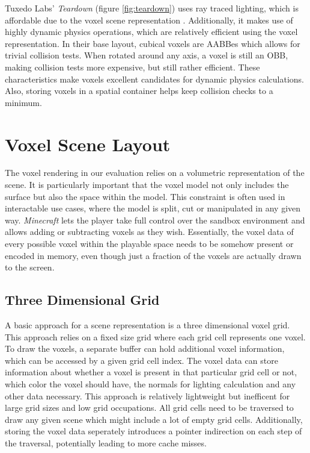 \noindent
Tuxedo Labs' \emph{Teardown} (figure \ref{fig:teardown}) uses ray traced lighting, which is affordable due 
to the voxel scene representation \cite{TuxedoLabs2022}. Additionally, it makes use of highly dynamic physics 
operations, which are relatively efficient using the voxel representation. In their base layout, cubical 
voxels are \ac{AABB}es which allows for trivial collision tests. When rotated around any axis, a voxel is 
still an \ac{OBB}, making collision tests more expensive, but still rather efficient. These characteristics 
make voxels excellent candidates for dynamic physics calculations. Also, storing voxels in a spatial container 
helps keep collision checks to a minimum.


\section{Voxel Scene Layout} \label{sec-voxel-scene-layout}

The voxel rendering in our evaluation relies on a volumetric representation of the scene.
It is particularly important that the voxel model not only includes the surface but also 
the space within the model. This constraint is often used in interactable use cases, where 
the model is split, cut or manipulated in any given way. \emph{Minecraft} \cite{Mojang2024}
lets the player take full control over the sandbox environment and allows adding or subtracting 
voxels as they wish. Essentially, the voxel data of every possible voxel within the playable 
space needs to be somehow present or encoded in memory, even though just a fraction of the 
voxels are actually drawn to the screen.


\subsection*{Three Dimensional Grid} \label{subsec-three-dimensional-grid}

A basic approach for a scene representation is a three dimensional voxel grid. This 
approach relies on a fixed size grid where each grid cell represents one voxel.
To draw the voxels, a separate buffer can hold additional voxel information, which 
can be accessed by a given grid cell index. The voxel data can store information about 
whether a voxel is present in that particular grid cell or not, which color the voxel 
should have, the normals for lighting calculation and any other data necessary.
This approach is relatively lightweight but inefficent for large grid sizes and low 
grid occupations. All grid cells need to be traversed to draw any given scene which 
might include a lot of empty grid cells. Additionally, storing the voxel data seperately
introduces a pointer indirection on each step of the traversal, potentially leading to more 
cache misses.


